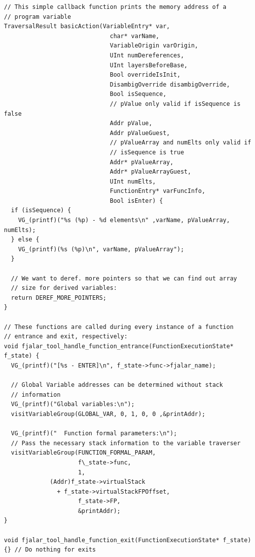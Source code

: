 \documentclass[11pt]{article}
\begin{document}
\begin{center}
\begin{lstlisting}
// This simple callback function prints the memory address of a
// program variable
TraversalResult basicAction(VariableEntry* var,
                              char* varName,
                              VariableOrigin varOrigin,
                              UInt numDereferences,
                              UInt layersBeforeBase,
                              Bool overrideIsInit,
                              DisambigOverride disambigOverride,
                              Bool isSequence,
                              // pValue only valid if isSequence is false
                              Addr pValue,
                              Addr pValueGuest,
                              // pValueArray and numElts only valid if
                              // isSequence is true
                              Addr* pValueArray,
                              Addr* pValueArrayGuest,
                              UInt numElts,
                              FunctionEntry* varFuncInfo,
                              Bool isEnter) {
  if (isSequence) {
    VG_(printf)("%s (%p) - %d elements\n" ,varName, pValueArray,  numElts);
  } else {
    VG_(printf)(%s (%p)\n", varName, pValueArray");
  }

  // We want to deref. more pointers so that we can find out array
  // size for derived variables:
  return DEREF_MORE_POINTERS;
}

// These functions are called during every instance of a function
// entrance and exit, respectively:
void fjalar_tool_handle_function_entrance(FunctionExecutionState* f_state) {
  VG_(printf)("[%s - ENTER]\n", f_state->func->fjalar_name);
  
  // Global Variable addresses can be determined without stack
  // information
  VG_(printf)("Global variables:\n");
  visitVariableGroup(GLOBAL_VAR, 0, 1, 0, 0 ,&printAddr);

  VG_(printf)("  Function formal parameters:\n");
  // Pass the necessary stack information to the variable traverser
  visitVariableGroup(FUNCTION_FORMAL_PARAM,
                     f\_state->func,
                     1,
		     (Addr)f_state->virtualStack
		       + f_state->virtualStackFPOffset,
                     f_state->FP,
                     &printAddr);
}

void fjalar_tool_handle_function_exit(FunctionExecutionState* f_state)
{} // Do nothing for exits
\end{lstlisting}
\end{center}



\end{document}
